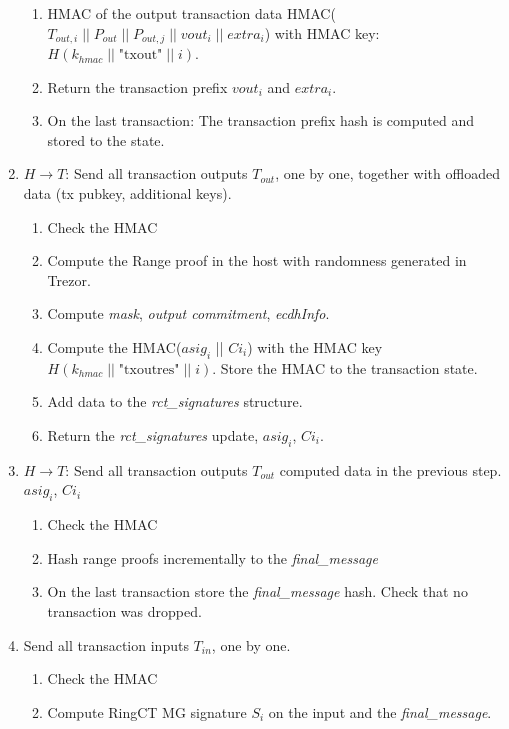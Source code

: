 \documentclass[]{article}
\begin{document}
\begin{enumerate}
\begin{enumerate}
        \item HMAC of the output transaction data HMAC($T_{out,i} \; || \; P_{out} \; || \; P_{out,j} \; || \; vout_i \; || \; extra_i $) with HMAC key: $H(k_{hmac} \; || \; \text{"txout"} \; || \; i)$.
		
		\item Return the transaction prefix $vout_i$ and $extra_i$.
		
		\item On the last transaction: The transaction prefix hash is computed and stored to the state.
	\end{enumerate}
	  
	\item $H \rightarrow T$: Send all transaction outputs $T_{out}$, one by one, together with offloaded data (tx pubkey, additional keys). 
	\begin{enumerate}
		\item Check the HMAC
		
		\item Compute the Range proof in the host with randomness generated in Trezor.
		
		\item Compute \emph{mask}, \emph{output commitment}, \emph{ecdhInfo}.
		
		\item Compute the HMAC($asig_i$ || $Ci_i$) with the HMAC key $H(k_{hmac} \; || \; \text{"txoutres"} \; || \; i)$. Store the HMAC to the transaction state.
		
		\item Add data to the \emph{rct\_signatures} structure.
		
		\item Return the \emph{rct\_signatures} update, $asig_i$, $Ci_i$.
	\end{enumerate}

	\item $H \rightarrow T$: Send all transaction outputs $T_{out}$ computed data in the previous step. $asig_i$, $Ci_i$
	\begin{enumerate}
		\item Check the HMAC
		
		\item Hash range proofs incrementally to the \emph{final\_message}
		
		\item On the last transaction store the \emph{final\_message} hash. Check that no transaction was dropped.
	\end{enumerate}

	\item Send all transaction inputs $T_{in}$, one by one.
	\begin{enumerate}
		\item Check the HMAC
		
		\item Compute RingCT MG signature $S_i$ on the input and the \emph{final\_message}.
		
	\end{enumerate} 
	
\end{enumerate}
\end{document}
